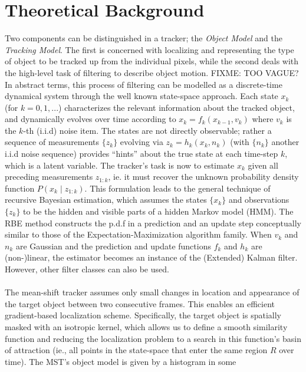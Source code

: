 \documentclass[a4paper,11pt]{article}
\begin{document}
	\section{Theoretical Background}
		Two components can be distinguished in a tracker; the \textit{Object Model}
		and the \textit{Tracking Model}. The first is concerned with localizing and
		representing the type of object to be tracked up from the individual pixels,
		while the second deals with the high-level task of filtering to describe object
		motion.
		FIXME: TOO VAGUE?
		In abstract terms, this process of filtering can be modelled as a discrete-time
		dynamical system through the well known state-space approach. Each state $x_k$
		(for $k=0, 1, ...$) characterizes the relevant information about the tracked
		object, and dynamically evolves over time according to $x_k = f_k(x_{k - 1}, v_k)$
		where $v_k$ is the $k$-th (i.i.d) noise item. The states are not directly observable;
		rather a sequence of measurements $\{z_k\}$ evolving via $z_k = h_k(x_k, n_k)$
		(with $\{n_k\}$ another i.i.d noise sequence) provides ``hints'' about the true
		state at each time-step $k$, which is a latent variable. The tracker's task
		is now to estimate $x_k$ given all preceding measurements $z_{1:k}$, ie. it
		must recover the unknown probability density function $P(x_k \mid z_{1:k})$.
		This formulation leads to the general technique of recursive Bayesian estimation,
		which assumes the states $\{x_k\}$ and observations $\{z_k\}$ to be the hidden
		and visible parts of a hidden Markov model (HMM). The RBE method constructs the
		p.d.f in a prediction and an update step conceptually similar to those of the
		Expectation-Maximization algorithm family. When $v_k$ and $n_k$ are Gaussian
		and the prediction and update functions $f_k$ and $h_k$ are (non-)linear, the
		estimator becomes an instance of the (Extended) Kalman filter. However, other
		filter classes can also be used.
		\\ \\
		The mean-shift tracker assumes only small changes in location and appearance
		of the target object between two consecutive frames. This enables an efficient
		gradient-based localization scheme. Specifically, the target object is spatially
		masked with an isotropic kernel, which allows us to define a smooth similarity
		function and reducing the localization problem to a search in this function's
		basin of attraction (ie., all points in the state-space that enter the same
		region $R$ over time). The MST's object model is given by a histogram in some
\end{document}
